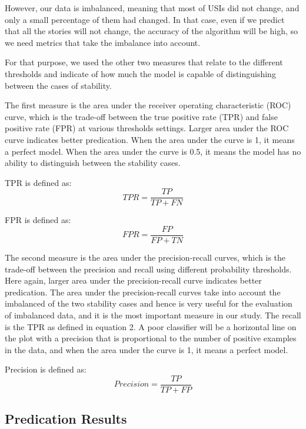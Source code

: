 However, our data is imbalanced, meaning that most of USIs did not change, and only a small percentage of them had changed. In that case, even if we predict that all the stories will not change, the accuracy of the algorithm will be high, so we need metrics that take the imbalance into account. 

For that purpose, we used the other two measures that relate to the different thresholds and indicate of how much the model is capable of distinguishing between the cases of stability.

The first measure is the area under the receiver operating characteristic (ROC) curve, which is the trade-off between the true positive rate (TPR) and false positive rate (FPR) at various thresholds settings. Larger area under the ROC curve indicates better predication. When the area under the curve is 1, it means a perfect model. When the area under the curve is 0.5, it means the model has no ability to distinguish between the stability cases.

TPR is defined as:
    \begin{equation}
        TPR = \frac{TP}{TP+FN}
    \end{equation}

FPR is defined as:
    \begin{equation}
        FPR = \frac{FP}{FP+TN}
    \end{equation}
    
The second measure is the area under the precision-recall curves, which is the trade-off between the precision and recall using different probability thresholds. Here again, larger area under the precision-recall curve indicates better predication. The area under the precision-recall curves take into account the imbalanced of the two stability cases and hence is very useful for the evaluation of imbalanced data, and it is the most important measure in our study. The recall is the TPR as defined in equation 2. A poor classifier will be a horizontal line on the plot with a precision that is proportional to the number of positive examples in the data, and when the area under the curve is 1, it means a perfect model.


Precision is defined as: 
    \begin{equation}
        Precision = \frac{TP}{TP+FP}
    \end{equation}


\subsection{Predication Results}

